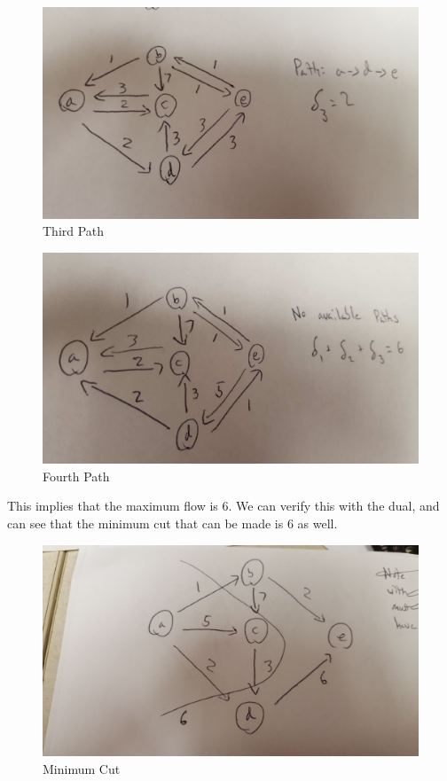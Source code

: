 \documentclass[10pt, letterpaper]{paper}
\begin{document}
\begin{figure}[H]
\centering
\includegraphics[width=1.0\textwidth]{ThridPath.jpeg}
\caption{ Third Path }
\end{figure}
\begin{figure}[H]
\centering
\includegraphics[width=1.0\textwidth]{FourthPath.jpeg}
\caption{ Fourth Path }
\end{figure}

This implies that the maximum flow is 6. We can verify this with the dual, and can see that the minimum cut that can be made is 6 as well.

\begin{figure}[H]
\centering
\includegraphics[width=1.0\textwidth]{Cut.jpeg}
\caption{ Minimum Cut }
\end{figure}
\end{document}
